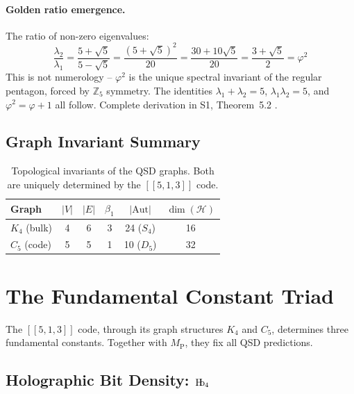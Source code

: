 \documentclass[11pt,a4paper]{article}
\theoremstyle{definition}
\newcommand{\Hb}{\textnormal{H\kern-0.3em b}}
\newcommand{\Hbfour}{\Hb_4}
\newcommand{\Mpl}{M_{\mathrm{P}}}
\begin{document}
\paragraph{Golden ratio emergence.} The ratio of non-zero eigenvalues:
\begin{equation}
\frac{\lambda_2}{\lambda_1} = \frac{5+\sqrt{5}}{5-\sqrt{5}} = \frac{(5+\sqrt{5})^2}{20} = \frac{30 + 10\sqrt{5}}{20} = \frac{3+\sqrt{5}}{2} = \varphi^2
\label{eq:golden}
\end{equation}
This is not numerology -- $\varphi^2$ is the unique spectral invariant of the regular pentagon, forced by $\mathbb{Z}_5$ symmetry. The identities $\lambda_1 + \lambda_2 = 5$, $\lambda_1 \lambda_2 = 5$, and $\varphi^2 = \varphi + 1$ all follow. Complete derivation in S1, Theorem~5.2 \cite{Hubka2026QSDsupp}.

\subsection{Graph Invariant Summary}

\begin{table}[h]
\centering
\begin{tabular}{lccccc}
\toprule
\textbf{Graph} & $|V|$ & $|E|$ & $\beta_1$ & $|\text{Aut}|$ & $\dim(\mathcal{H})$ \\
\midrule
$K_4$ (bulk) & 4 & 6 & 3 & 24 ($S_4$) & 16 \\
$C_5$ (code) & 5 & 5 & 1 & 10 ($D_5$) & 32 \\
\bottomrule
\end{tabular}
\caption{Topological invariants of the QSD graphs. Both are uniquely determined by the $[[5,1,3]]$ code.}
\label{tab:invariants}
\end{table}

\section{The Fundamental Constant Triad}
\label{sec:triad}

The $[[5,1,3]]$ code, through its graph structures $K_4$ and $C_5$, determines three fundamental constants. Together with $\Mpl$, they fix all QSD predictions.

\subsection{Holographic Bit Density: $\Hbfour$}
\end{document}
